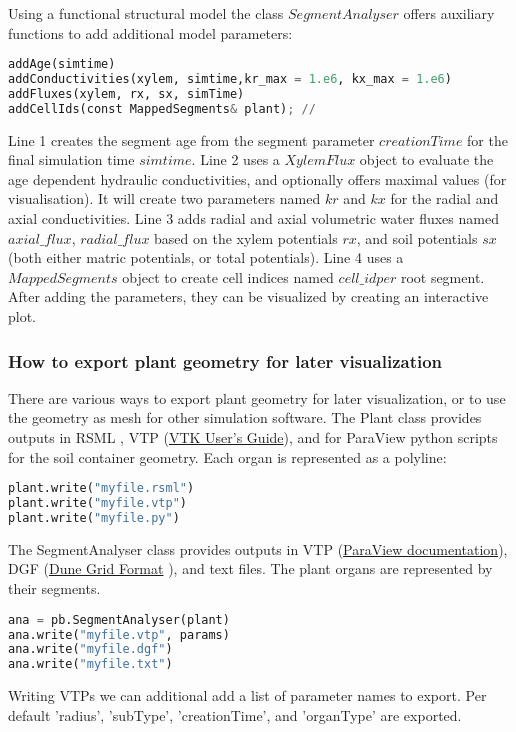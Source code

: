 Using a functional structural model the class $SegmentAnalyser$ offers auxiliary functions to add additional model parameters:
\begin{lstlisting}[language=Python]
addAge(simtime) 
addConductivities(xylem, simtime,kr_max = 1.e6, kx_max = 1.e6)
addFluxes(xylem, rx, sx, simTime)
addCellIds(const MappedSegments& plant); // 
\end{lstlisting}
Line 1 creates the segment age from the segment parameter $creationTime$ for the final simulation time $simtime$. Line 2 uses a $XylemFlux$ object to evaluate the age dependent hydraulic conductivities, and optionally offers maximal values (for visualisation). It will create two parameters named $kr$ and $kx$ for the radial and axial conductivities.  Line 3 adds radial and axial volumetric water fluxes named  $axial\_flux$, $radial\_flux$ based on the xylem potentials $rx$, and soil potentials $sx$ (both either matric potentials, or total potentials). Line 4 uses a $MappedSegments$ object to create cell indices named $cell\_id per$ root segment. After adding the parameters, they can be visualized by creating an interactive plot. 


\subsubsection*{How to export plant geometry for later visualization} \label{ssec:export}

There are various ways to export plant geometry for later visualization, or to use the geometry as mesh for other simulation software.
The Plant class provides outputs in RSML \citep{lobet2015root}, VTP (\href{https://vtk.org/vtk-users-guide/}{VTK User's Guide}), and for ParaView python scripts for the soil container geometry. Each organ is represented as a polyline:
\begin{lstlisting}[language=Python]
plant.write("myfile.rsml")
plant.write("myfile.vtp")
plant.write("myfile.py")
\end{lstlisting}

The SegmentAnalyser class provides outputs in VTP (\href{https://docs.paraview.org/en/latest/ReferenceManual/index.html}{ParaView documentation}), DGF (\href{https://dune-project.org/doxygen/2.4.1/group__DuneGridFormatParser.html}{Dune Grid Format} ), and text files. The plant organs are represented by their segments.
\begin{lstlisting}[language=Python]
ana = pb.SegmentAnalyser(plant)
ana.write("myfile.vtp", params)
ana.write("myfile.dgf")
ana.write("myfile.txt")
\end{lstlisting}
Writing VTPs we can additional add a list of parameter names to export. Per default 'radius', 'subType', 'creationTime', and 'organType' are exported. 


